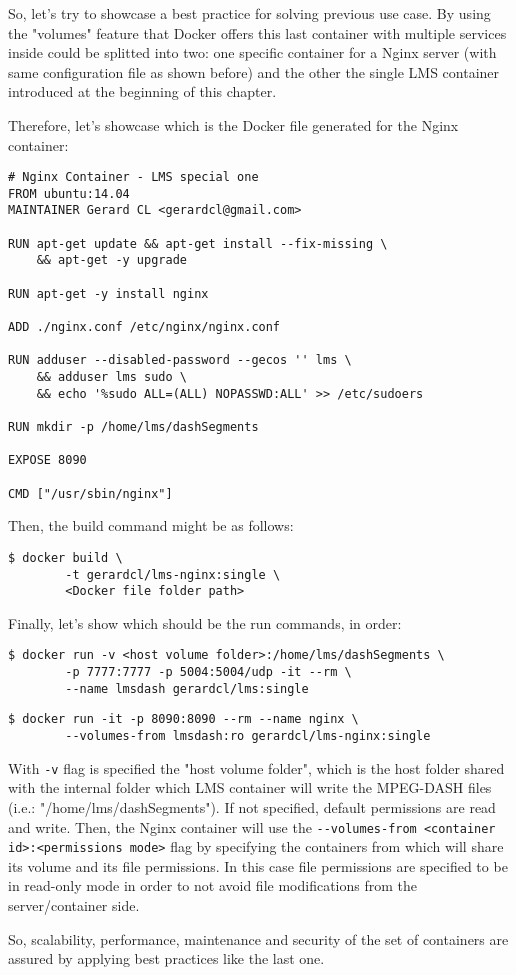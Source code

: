 So, let's try to showcase a best practice for solving previous use case. By using the "volumes" feature that Docker offers this last container with multiple services inside could be splitted into two: one specific container for a Nginx server (with same configuration file as shown before) and the other the single LMS container introduced at the beginning of this chapter. 

Therefore, let's showcase which is the Docker file generated for the Nginx container:

\begin{verbatim}
# Nginx Container - LMS special one
FROM ubuntu:14.04
MAINTAINER Gerard CL <gerardcl@gmail.com>

RUN apt-get update && apt-get install --fix-missing \
	&& apt-get -y upgrade

RUN apt-get -y install nginx 

ADD ./nginx.conf /etc/nginx/nginx.conf

RUN adduser --disabled-password --gecos '' lms \
	&& adduser lms sudo \
	&& echo '%sudo ALL=(ALL) NOPASSWD:ALL' >> /etc/sudoers

RUN mkdir -p /home/lms/dashSegments

EXPOSE 8090

CMD ["/usr/sbin/nginx"]  
\end{verbatim}

Then, the build command might be as follows:

\begin{verbatim}
$ docker build \
		-t gerardcl/lms-nginx:single \
		<Docker file folder path>
\end{verbatim}

Finally, let's show which should be the run commands, in order:

\begin{verbatim}
$ docker run -v <host volume folder>:/home/lms/dashSegments \
		-p 7777:7777 -p 5004:5004/udp -it --rm \
		--name lmsdash gerardcl/lms:single
\end{verbatim}

\begin{verbatim}
$ docker run -it -p 8090:8090 --rm --name nginx \
		--volumes-from lmsdash:ro gerardcl/lms-nginx:single 
\end{verbatim}

With \verb|-v| flag is specified the "host volume folder", which is the host folder shared with the internal folder which LMS container will write the MPEG-DASH files (i.e.: "/home/lms/dashSegments"). If not specified, default permissions are read and write. Then, the Nginx container will use the \verb|--volumes-from <container id>:<permissions mode>| flag by specifying the containers from which will share its volume and its file permissions. In this case file permissions are specified to be in read-only mode in order to not avoid file modifications from the server/container side.  
 
So, scalability, performance, maintenance and security of the set of containers are assured by applying best practices like the last one.
